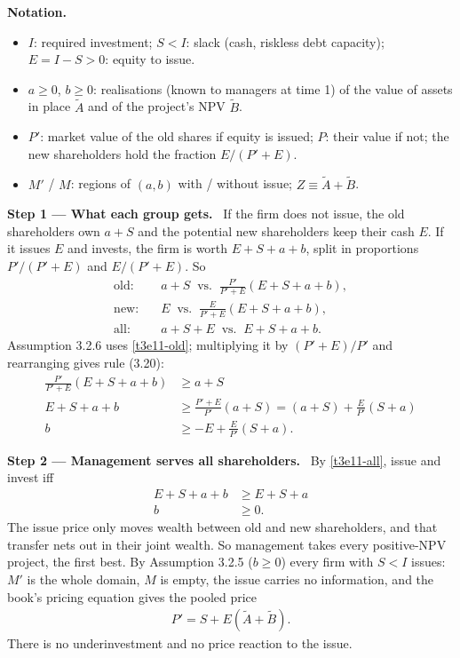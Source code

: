 \documentclass[11pt,a4paper]{article}
\newcommand{\notation}{\par\noindent\textbf{Notation.}}
\newcommand{\step}[2]{\par\medskip\noindent\textbf{Step #1 --- #2.}~}
\begin{document}
\notation
\begin{itemize}
  \item $I$: required investment; $S<I$: slack (cash, riskless debt capacity); $E=I-S>0$: equity to issue.
  \item $a\ge0$, $b\ge0$: realisations (known to managers at time 1) of the value of assets in place $\widetilde A$ and of the project's NPV $\widetilde B$.
  \item $P'$: market value of the old shares if equity is issued; $P$: their value if not; the new shareholders hold the fraction $E/(P'+E)$.
  \item $M'$ / $M$: regions of $(a,b)$ with / without issue; $Z\equiv\widetilde A+\widetilde B$.
\end{itemize}

\step{1}{What each group gets} If the firm does not issue, the old shareholders own $a+S$ and the potential
new shareholders keep their cash $E$. If it issues $E$ and invests, the firm is worth $E+S+a+b$, split
in proportions $P'/(P'+E)$ and $E/(P'+E)$. So
\begin{align}
  \text{old:}&\quad a+S \;\;\text{vs.}\;\; \frac{P'}{P'+E}(E+S+a+b), \label{t3e11-old}\\
  \text{new:}&\quad E \;\;\text{vs.}\;\; \frac{E}{P'+E}(E+S+a+b), \label{t3e11-new}\\
  \text{all:}&\quad a+S+E \;\;\text{vs.}\;\; E+S+a+b. \label{t3e11-all}
\end{align}
Assumption 3.2.6 uses \eqref{t3e11-old}; multiplying it by $(P'+E)/P'$ and rearranging gives rule (3.20):
\begin{align}
  \frac{P'}{P'+E}(E+S+a+b) &\ge a+S \nonumber\\
  E+S+a+b &\ge \frac{P'+E}{P'}(a+S) = (a+S)+\frac{E}{P'}(S+a) \nonumber\\
  b &\ge -E+\frac{E}{P'}(S+a). \tag{3.20}
\end{align}

\step{2}{Management serves all shareholders} By \eqref{t3e11-all}, issue and invest iff
\begin{align}
  E+S+a+b &\ge E+S+a \nonumber\\
  b &\ge 0. \label{t3e11-allrule}
\end{align}
The issue price only moves wealth between old and new shareholders, and that transfer nets out in their
joint wealth. So management takes every positive-NPV project, the first best. By Assumption 3.2.5
($b\ge0$) every firm with $S<I$ issues: $M'$ is the whole domain, $M$ is empty, the issue carries no
information, and the book's pricing equation gives the pooled price
\begin{align}
  P' = S+E(\widetilde A+\widetilde B). \label{t3e11-Pall}
\end{align}
There is no underinvestment and no price reaction to the issue.
\end{document}
